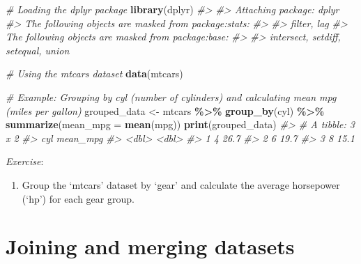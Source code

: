 \documentclass[
]{book}
\newenvironment{Shaded}{\begin{snugshade}}{\end{snugshade}}
\newcommand{\AttributeTok}[1]{\textcolor[rgb]{0.13,0.29,0.53}{#1}}
\newcommand{\CommentTok}[1]{\textcolor[rgb]{0.56,0.35,0.01}{\textit{#1}}}
\newcommand{\FunctionTok}[1]{\textcolor[rgb]{0.13,0.29,0.53}{\textbf{#1}}}
\newcommand{\NormalTok}[1]{#1}
\newcommand{\OtherTok}[1]{\textcolor[rgb]{0.56,0.35,0.01}{#1}}
\newcommand{\SpecialCharTok}[1]{\textcolor[rgb]{0.81,0.36,0.00}{\textbf{#1}}}
\providecommand{\tightlist}{%
  \setlength{\itemsep}{0pt}\setlength{\parskip}{0pt}}
\begin{document}
\begin{Shaded}
\begin{Highlighting}[]
\CommentTok{\# Loading the dplyr package}
\FunctionTok{library}\NormalTok{(dplyr)}
\CommentTok{\#\textgreater{} }
\CommentTok{\#\textgreater{} Attaching package: \textquotesingle{}dplyr\textquotesingle{}}
\CommentTok{\#\textgreater{} The following objects are masked from \textquotesingle{}package:stats\textquotesingle{}:}
\CommentTok{\#\textgreater{} }
\CommentTok{\#\textgreater{}     filter, lag}
\CommentTok{\#\textgreater{} The following objects are masked from \textquotesingle{}package:base\textquotesingle{}:}
\CommentTok{\#\textgreater{} }
\CommentTok{\#\textgreater{}     intersect, setdiff, setequal, union}

\CommentTok{\# Using the \textquotesingle{}mtcars\textquotesingle{} dataset}
\FunctionTok{data}\NormalTok{(mtcars)}

\CommentTok{\# Example: Grouping by \textquotesingle{}cyl\textquotesingle{} (number of cylinders) and calculating mean mpg (miles per gallon)}
\NormalTok{grouped\_data }\OtherTok{\textless{}{-}}\NormalTok{ mtcars }\SpecialCharTok{\%\textgreater{}\%}
  \FunctionTok{group\_by}\NormalTok{(cyl) }\SpecialCharTok{\%\textgreater{}\%}
  \FunctionTok{summarize}\NormalTok{(}\AttributeTok{mean\_mpg =} \FunctionTok{mean}\NormalTok{(mpg))}
\FunctionTok{print}\NormalTok{(grouped\_data)}
\CommentTok{\#\textgreater{} \# A tibble: 3 x 2}
\CommentTok{\#\textgreater{}     cyl mean\_mpg}
\CommentTok{\#\textgreater{}   \textless{}dbl\textgreater{}    \textless{}dbl\textgreater{}}
\CommentTok{\#\textgreater{} 1     4     26.7}
\CommentTok{\#\textgreater{} 2     6     19.7}
\CommentTok{\#\textgreater{} 3     8     15.1}
\end{Highlighting}
\end{Shaded}

\emph{Exercise}:

\begin{enumerate}
\def\labelenumi{\arabic{enumi}.}
\tightlist
\item
  Group the `mtcars' dataset by `gear' and calculate the average horsepower (`hp') for each gear group.
\end{enumerate}

\section*{Joining and merging datasets}\label{joining-and-merging-datasets}
\end{document}
